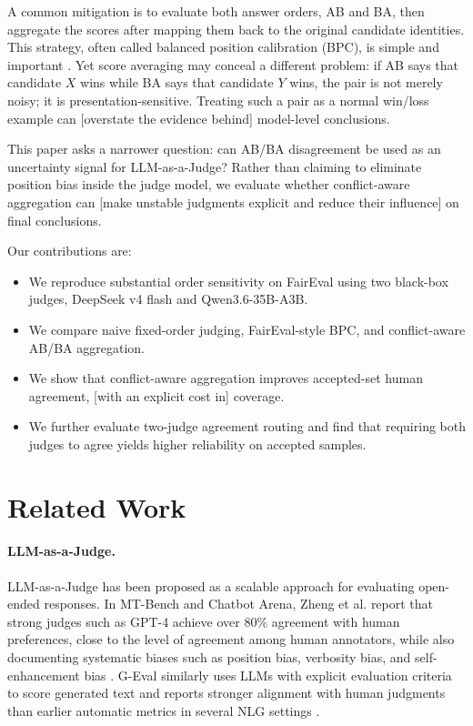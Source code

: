 \documentclass[11pt]{article}
\begin{document}
A common mitigation is to evaluate both answer orders, AB and BA, then aggregate the scores after mapping them back to the original candidate identities. This strategy, often called balanced position calibration (BPC), is simple and important \cite{wang2024faireval}. Yet score averaging may conceal a different problem: if AB says that candidate $X$ wins while BA says that candidate $Y$ wins, the pair is not merely noisy; it is presentation-sensitive. Treating such a pair as a normal win/loss example can [overstate the evidence behind] model-level conclusions.

This paper asks a narrower question: can AB/BA disagreement be used as an uncertainty signal for LLM-as-a-Judge? Rather than claiming to eliminate position bias inside the judge model, we evaluate whether conflict-aware aggregation can [make unstable judgments explicit and reduce their influence] on final conclusions.

Our contributions are:
\begin{itemize}
    \item We reproduce substantial order sensitivity on FairEval using two black-box judges, DeepSeek v4 flash and Qwen3.6-35B-A3B.
    \item We compare naive fixed-order judging, FairEval-style BPC, and conflict-aware AB/BA aggregation.
    \item We show that conflict-aware aggregation improves accepted-set human agreement, [with an explicit cost in] coverage.
    \item We further evaluate two-judge agreement routing and find that requiring both judges to agree yields higher reliability on accepted samples.
\end{itemize}

\section{Related Work}

\paragraph{LLM-as-a-Judge.}
LLM-as-a-Judge has been proposed as a scalable approach for evaluating open-ended responses. In MT-Bench and Chatbot Arena, Zheng et al. report that strong judges such as GPT-4 achieve over 80\% agreement with human preferences, close to the level of agreement among human annotators, while also documenting systematic biases such as position bias, verbosity bias, and self-enhancement bias \cite{zheng2023judging}. G-Eval similarly uses LLMs with explicit evaluation criteria to score generated text and reports stronger alignment with human judgments than earlier automatic metrics in several NLG settings \cite{liu2023geval}.
\end{document}
